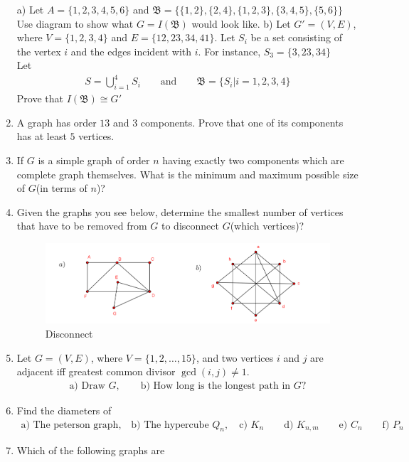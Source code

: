 \documentclass[paper=a4, fontsize=11pt,twoside]{scrartcl}		%
\theoremstyle{definition}
\theoremstyle{remark}
\begin{document}
\begin{enumerate}
    \subitem a) Let $A=\{1,2,3,4,5,6\}$ and $\mathfrak{B}=\{\{1,2\},\{2,4\},\{1,2,3\},\{3,4,5\},\{5,6\}\}$\\
    Use diagram to show what $G=I(\mathfrak{B})$ would look like.
    \subitem b) Let $G'=(V,E)$, where $V=\{1,2,3,4\}$ and $E=\{12,23,34,41\}$. Let $S_i$ be a set consisting of the vertex $i$ and the edges incident with $i$. For instance, $S_3=\{3,23,34\}$\\
    Let
    \begin{align*}
    S=\bigcup_{i=1}^4 S_i\qquad\text{and}\qquad \mathfrak{B}=\{S_i|i=1,2,3,4\}
    \end{align*}
    Prove that $I(\mathfrak{B})\cong G'$
    \item A graph has order $13$ and $3$ components. Prove that one of its components has at least $5$ vertices.
    \item If $G$ is a simple graph of order $n$ having exactly two components which are complete graph themselves. What is the minimum and maximum possible size of $G$(in terms of $n$)?
    \item Given the graphs you see below, determine the smallest number of vertices that have to be removed from $G$ to disconnect $G$(which vertices)?
  \begin{figure}[hbt!]
\centering
\includegraphics[width=1.0\textwidth]{GrapAss2.png}
\caption{Disconnect}\label{fig2}
\end{figure}
  \item Let $G=(V,E)$, where $V=\{1,2,\ldots,15\}$, and two vertices $i$ and $j$ are adjacent iff greatest common divisor $\gcd(i,j)\neq 1$.
  \begin{align*}
      \text{a) Draw $G$} ,\qquad \text{b) How long is the longest path in $G$?}
      \end{align*}
  \item Find the diameters of
  \begin{align*}
      \text{a) The peterson graph,} \quad \text{b) The hypercube $Q_n$},\quad \text{c) } K_n\qquad \text{d) } K_{n,m} \qquad \text{e) } C_n \qquad \text{f) } P_n
  \end{align*}
  \item Which of the following graphs are \\

\end{enumerate}
\end{document}
